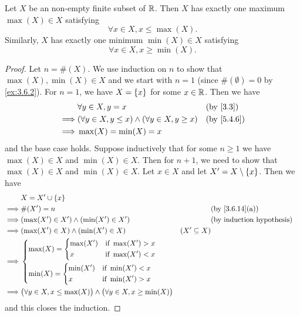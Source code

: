\begin{ac}\label{ac:5.4.1}
	Let \(X\) be an non-empty finite subset of \(\mathbb{R}\).
	Then \(X\) has exactly one maximum \(\max(X) \in X\) satisfying
	\[
		\forall x \in X, x \leq \max(X).
	\]
	Similarly, \(X\) has exactly one minimum \(\min(X) \in X\) satisfying
	\[
		\forall x \in X, x \geq \min(X).
	\]
\end{ac}

\begin{proof}
	Let \(n = \#(X)\).
	We use induction on \(n\) to show that \(\max(X), \min(X) \in X\) and we start with \(n = 1\) (since \(\#(\emptyset) = 0\) by \cref{ex:3.6.2}).
	For \(n = 1\), we have \(X = \left\lbrace x\right\rbrace\) for some \(x \in \mathbb{R}\).
	Then we have
	\begin{align*}
		         & \forall y \in X, y = x                                        &  & \by{3.3}   \\
		\implies & (\forall y \in X, y \leq x) \land (\forall y \in X, y \geq x) &  & \by{5.4.6} \\
		\implies & \max(X) = \min(X) = x
	\end{align*}
	and the base case holds.
	Suppose inductively that for some \(n \geq 1\) we have \(\max(X) \in X\) and \(\min(X) \in X\).
	Then for \(n + 1\), we need to show that \(\max(X) \in X\) and \(\min(X) \in X\).
	Let \(x \in X\) and let \(X' = X \setminus \left\lbrace x\right\rbrace\).
	Then we have
	\begin{align*}
		         & X = X' \cup \set{x}                                                                                                                         \\
		\implies & \#(X') = n                                                                                &                  & \text{(by \cref{3.6.14}(a))} \\
		\implies & (\max(X') \in X') \land (\min(X') \in X')                                                 &                  & \byIH                        \\
		\implies & (\max(X') \in X) \land (\min(X') \in X)                                                   & (X' \subseteq X)                                \\
		\implies & \begin{dcases}
			           \max(X) = \begin{dcases}
				          \max(X') & \text{if } \max(X') > x \\
				          x        & \text{if } \max(X') < x
			          \end{dcases} \\
			           \min(X) = \begin{dcases}
				          \min(X') & \text{if } \min(X') < x \\
				          x        & \text{if } \min(X') > x
			          \end{dcases}
		           \end{dcases}                                                                                                        \\
		\implies & \big(\forall y \in X, x \leq \max(X)\big) \land \big(\forall y \in X, x \geq \min(X)\big)
	\end{align*}
	and this closes the induction.


\end{proof}
